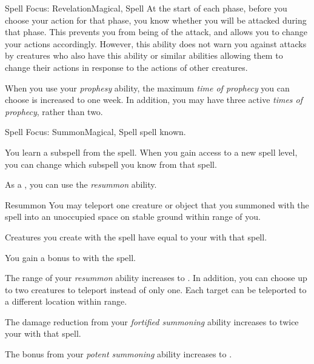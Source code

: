 \begin{feat}{Spell Focus: Revelation}{Magical, Spell}
         At the start of each phase, before you choose your action for that phase, you know whether you will be attacked during that phase.
        This prevents you from being \unaware of the attack, and allows you to change your actions accordingly.
        However, this ability does not warn you against attacks by creatures who also have this ability or similar abilities allowing them to change their actions in response to the actions of other creatures.

         When you use your \textit{prophesy} ability, the maximum \textit{time of prophecy} you can choose is increased to one week.
        In addition, you may have three active \textit{times of prophecy}, rather than two.
    \end{feat}

    \begin{feat}{Spell Focus: Summon}{Magical, Spell}
        \featpre {} spell known.

         You learn a subspell from the  spell.
        When you gain access to a new spell level, you can change which subspell you know from that spell.

         As a , you can use the \textit{resummon} ability.
        \begin{ability}{Resummon}
            You may teleport one creature or object that you summoned with the  spell into an unoccupied space on stable ground within \rngmed range of you.
        \end{ability}

         Creatures you create with the  spell have  equal to your  with that spell.

         You gain a  bonus to  with the  spell.

         The range of your \textit{resummon} ability increases to \rnglong.
        In addition, you can choose up to two creatures to teleport instead of only one.
        Each target can be teleported to a different location within range.

         The damage reduction from your \textit{fortified summoning} ability increases to twice your  with that spell.

         The bonus from your \textit{potent summoning} ability increases to .
    \end{feat}

